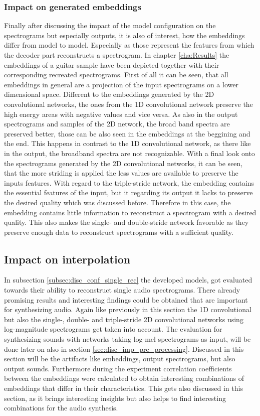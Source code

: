 \subsubsection{Impact on generated embeddings}
Finally after discussing the impact of the model configuration on the spectrograms but especially outputs, it is also of interest, how the embeddings differ from model to model. Especially as those represent the features from which the decoder part reconstructs a spectrogram. In chapter \ref{cha:Results} the embeddings of a guitar sample have been depicted together with their corresponding recreated spectrograms. First of all it can be seen, that all embeddings in general are a projection of the input spectrograms on a lower dimensional space. Different to the embeddings generated by the 2D convolutional networks, the ones from the 1D convolutional network preserve the high energy areas with negative values and vice versa. As also in the output spectrograms and samples of the 2D network, the broad band spectra are preserved better, those can be also seen in the embeddings at the beggining and the end. This happens in contrast to the 1D convolutional network, as there like in the output, the broadband spectra are not recognizable. With a final look onto the spectrograms generated by the 2D convolutional networks, it can be seen, that the more striding is applied the less values are available to preserve the inputs features. With regard to the triple-stride network, the embedding contains the essential features of the input, but it regarding its output it lacks to preserve the desired quality which was discussed before. Therefore in this case, the embedding contains little information to reconstruct a spectrogram with a desired quality. This also makes the single- and double-stride network favorable as they preserve enough data to reconstruct spectrograms with a sufficient quality.


\subsection{Impact on interpolation}
\label{subsec:disc_conf_inter}
In subsection \ref{subsec:disc_conf_single_rec} the developed models, got evaluated towards their ability to reconstruct single audio spectrograms. There already promising results and interesting findings could be obtained that are important for synthesizing audio. Again like previously in this section the 1D convolutional but also the single-, double- and triple-stride 2D convolutional networks using log-magnitude spectrograms get taken into account. The evaluation for synthesizing sounds with networks taking log-mel spectrograms as input, will be done later on also in section \ref{sec:disc_imp_pre_processing}. Discussed in this section will be the artifacts like embeddings, output spectrograms, but also output sounds. Furthermore during the experiment correlation coefficients between the embeddings were calculated to obtain interesting combinations of embeddings that differ in their characteristics. This gets also discussed in this section, as it brings interesting insights but also helps to find interesting combinations for the audio synthesis.

